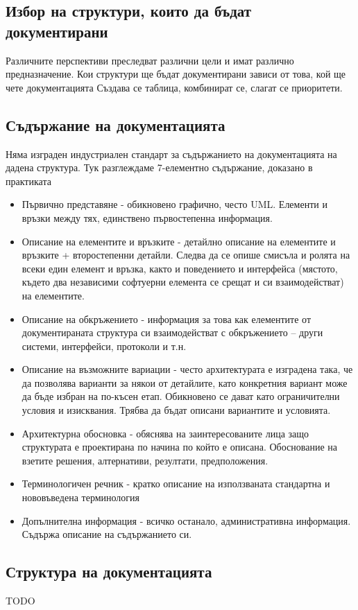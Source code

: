 \documentclass[fleqn,12pt]{article}
\begin{document}
\subsection{Избор на структури, които да бъдат документирани}
Различните перспективи преследват различни цели и имат различно предназначение.
Кои структури ще бъдат документирани зависи от това, кой ще чете документацията
Създава се таблица, комбинират се, слагат се приоритети.

\subsection{Съдържание на документацията}
Няма изграден индустриален стандарт за съдържанието на документацията на дадена структура. Тук разглеждаме 7-елементно съдържание, доказано в практиката

\begin{itemize}
\item Първично представяне -  обикновено графично, често UML. Елементи и връзки между тях, единствено първостепенна информация.
\item Описание на елементите и връзките - детайлно описание на елементите и връзките + второстепенни детайли. Следва да се опише смисъла и ролята на всеки един елемент и връзка, както и поведението и интерфейса (мястото, където два независими софтуерни елемента се срещат и си взаимодействат)  на елементите.
\item Описание на обкръжението - информация за това как елементите от документираната структура си взаимодействат с обкръжението – други системи, интерфейси, протоколи и т.н.
\item Описание на възможните вариации - често архитектурата е изградена така, че да позволява варианти за някои от детайлите, като конкретния вариант може да бъде избран на по-късен етап. Обикновено се дават като ограничителни условия и изисквания. Трябва да бъдат описани вариантите и условията.
\item Архитектурна обосновка - обяснява на заинтересованите лица защо структурата е проектирана по начина по който е описана. Обоснование на взетите решения, алтернативи, резултати, предположения.
\item Терминологичен речник - кратко описание на използваната стандартна и нововъведена терминология
\item Допълнителна информация - всичко останало, административна информация. Съдържа описание на съдържанието си.
\end{itemize}

\subsection{Структура на документацията}
TODO
\end{document}

